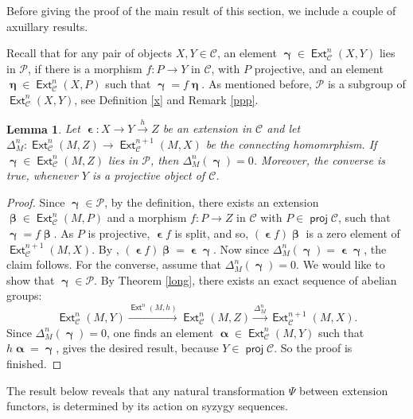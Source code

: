 \documentclass[11pt,a4paper]{amsart}
\newcommand{\rt}{\rightarrow}
\newcommand{\lrt}{\longrightarrow}
\newcommand{\st}{\stackrel}
\newcommand{\C}{\mathscr{C} }
\newcommand{\p}{\mathfrak{p} }
\def\proj{\operatorname{\mathsf{proj}}}
\def\Ext{\operatorname{{\mathsf{Ext}}}}
\def\p{\mathcal P}
\def\al{\operatorname{\boldsymbol{\alpha}}}
\def\be{\operatorname{\boldsymbol{\beta}}}
\def\ga{\operatorname{\boldsymbol{\gamma}}}
\def\ep{\operatorname{\boldsymbol{\epsilon}}}
\def\et{\operatorname{\boldsymbol{\eta}}}
\newtheorem{lem}[theorem]{Lemma}
\theoremstyle{definition}
\theoremstyle{plain}
\theoremstyle{definition}
\numberwithin{equation}{section}
\begin{document}
Before giving the proof of the main result of this section, we include a couple of axuillary results. 

Recall that for any pair of objects $X, Y\in\C$, an element $\ga\in\Ext^n_{\C}(X, Y)$ lies in $\p$, if there is a morphism $f:P\rt Y$ in $\C$, with $P$ projective, and an element $\et\in\Ext^n_{\C}(X, P)$ such that $\ga=f\et$. As mentioned before, $\p$ is a subgroup of $\Ext^n_{\C}(X, Y)$, see Definition \ref{x} and Remark \ref{ppp}.

 \begin{lem}\label{p} Let $\ep: X\rt Y\st{h}\rt Z$ be an extension in $\C$ and let $\Delta_M^n: \Ext^n_{\C}(M, Z)\rt\Ext^{n+1}_{\C}(M, X)$ be the connecting homomrphism. If $\ga\in\Ext^n_{\C}(M, Z)$ lies in $\p$, then $\Delta^n_M(\ga)=0$. Moreover, the converse is true, whenever $Y$ is a projective object of $\C$.
\end{lem}
\begin{proof}
Since $\ga\in\p$, by the definition, there exists an extension $\be\in\Ext^n_{\C}(M, P)$ and a morphism $f:P\rt Z$  in $\C$ with $P\in\proj\C$, such that $\ga=f\be$. As $P$ is projective, $\ep f$ is split, and so, $(\ep f)\be$ is a zero element of $\Ext^{n+1}_{\C}(M, X).$  By \cite[Chapter VII, Proposition 3.1]{mit},  $(\ep f)\be=\ep\ga$. Now since $\Delta^n_M(\ga)=\ep\ga$, the claim follows. For the converse, assume that $\Delta^n_M(\ga)=0$. We would like to show that $\ga\in\p$.  By Theorem \ref{long}, there exists an exact sequence of abelian groups: $$\Ext^n_{\C}(M, Y)\st{\Ext^n(M, h)}\lrt\Ext^n_{\C}(M, Z)\st{\Delta^n_M}\lrt\Ext^{n+1}_{\C}(M, X).$$Since $\Delta_M^n(\ga)=0$, one finds an element  $\al\in\Ext^n_{\C}(M, Y)$ such that $h\al=\ga$, gives the desired result, because $Y\in\proj\C$. So the proof is finished.
\end{proof}

The result below reveals that any natural transformation $\Psi$ between extension functors, is determined by its action  on syzygy sequences.
\end{document}
